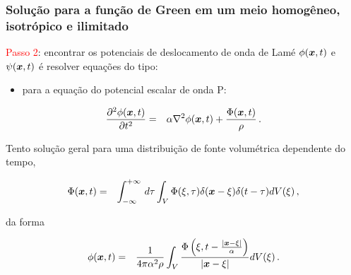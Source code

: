 \documentclass{beamer}
\newcommand{\xvec}{\vc{x}}
\newcommand{\xivec}{\boldmath \xi}
\begin{document}
\begin{frame}
	\frametitle{\textbf{Solu\c{c}\~ao para a fun\c{c}\~ao de Green em um meio homog\^eneo, isotr\'opico e ilimitado}}
	
	\begin{flushleft}
		\textcolor{red}{Passo 2}:\hspace{0.025cm} encontrar os potenciais de deslocamento de onda de Lam\'e $\phi(\xvec,t)$ e $\psi(\xvec,t)$ \'e resolver equa\c{c}\~oes do tipo:\\ 
	\end{flushleft}
	\begin{itemize}
		\item para a equa\c{c}\~ao do potencial escalar de onda P: 
	\end{itemize} 
	\begin{eqnarray}
	\label{ten1}  
	\frac{\partial^2 \phi(\xvec,t)}{\partial t^2} &=& \alpha \nabla^2 \phi(\xvec,t) + \frac{\Phi(\xvec,t)}{\rho} \, .
	\end{eqnarray}
	
	\begin{flushleft}
		Tento solu\c{c}\~ao geral para uma distribui\c{c}\~ao de fonte volum\'etrica dependente do tempo,
	\end{flushleft}
	\begin{eqnarray}
	\Phi(\xvec,t) &=&  \int_{-\infty}^{+\infty}\, d\tau \int_{V} \Phi(\xivec,\tau)\delta(\xvec -\xivec)\delta(t -\tau) dV(\xivec)\, ,
	\end{eqnarray}
	\begin{flushleft}
		da forma
	\end{flushleft}
	\begin{eqnarray}
	\phi(\xvec,t) &=& \frac{1}{4\pi\alpha^{2} \rho} \int_{V} \frac{ \Phi \left( \xivec,t - \frac{\left|\xvec - \xivec \right|}{\alpha}  \right) }{\left|\xvec - \xivec \right|} dV(\xivec)\, .
	\end{eqnarray} 
	
\end{frame}%
\end{document}
